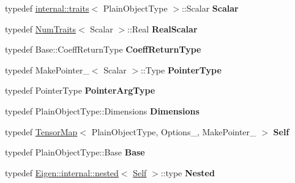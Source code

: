 \begin{DoxyCompactItemize}
\item 
\mbox{\label{class_eigen_1_1_tensor_map_aa21e8ca54c18ec42d33f38a2787a89b3}} 
typedef \hyperlink{struct_eigen_1_1internal_1_1traits}{internal\+::traits}$<$ Plain\+Object\+Type $>$\+::Scalar {\bfseries Scalar}
\item 
\mbox{\label{class_eigen_1_1_tensor_map_ac92362b6f148ed90c683631f2d56f7cd}} 
typedef \hyperlink{group___core___module_struct_eigen_1_1_num_traits}{Num\+Traits}$<$ Scalar $>$\+::Real {\bfseries Real\+Scalar}
\item 
\mbox{\label{class_eigen_1_1_tensor_map_acff28fd324083a21768f634e5c15581e}} 
typedef Base\+::\+Coeff\+Return\+Type {\bfseries Coeff\+Return\+Type}
\item 
\mbox{\label{class_eigen_1_1_tensor_map_a528cd8312fd353888faab1a5b3279ffd}} 
typedef Make\+Pointer\+\_\+$<$ Scalar $>$\+::Type {\bfseries Pointer\+Type}
\item 
\mbox{\label{class_eigen_1_1_tensor_map_abd0e1e1d71703c60543d2dc57a23faa3}} 
typedef Pointer\+Type {\bfseries Pointer\+Arg\+Type}
\item 
\mbox{\label{class_eigen_1_1_tensor_map_a14f97cddfedd7156d2df6c1ccd7767cc}} 
typedef Plain\+Object\+Type\+::\+Dimensions {\bfseries Dimensions}
\item 
\mbox{\label{class_eigen_1_1_tensor_map_a977bb3cd8718b16bec8f31512c5c71f1}} 
typedef \hyperlink{class_eigen_1_1_tensor_map}{Tensor\+Map}$<$ Plain\+Object\+Type, Options\+\_\+, Make\+Pointer\+\_\+ $>$ {\bfseries Self}
\item 
\mbox{\label{class_eigen_1_1_tensor_map_a93f442513f01319c29bd90fcc2e6e6f5}} 
typedef Plain\+Object\+Type\+::\+Base {\bfseries Base}
\item 
\mbox{\label{class_eigen_1_1_tensor_map_a42dc567f9a5a5a75099aeca66982b054}} 
typedef \hyperlink{struct_eigen_1_1internal_1_1nested}{Eigen\+::internal\+::nested}$<$ \hyperlink{class_eigen_1_1_tensor_map}{Self} $>$\+::type {\bfseries Nested}

\end{DoxyCompactItemize}
